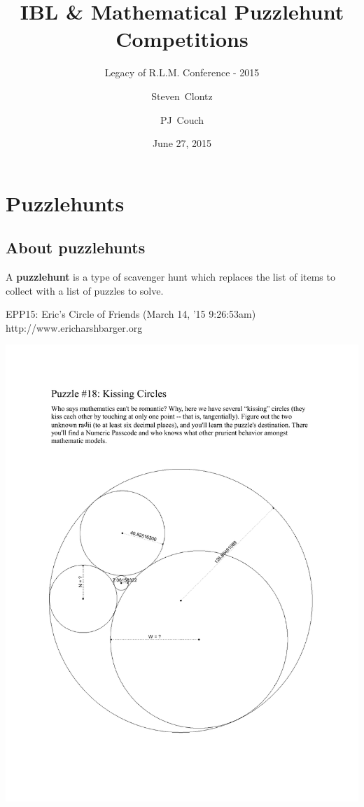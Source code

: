 \documentclass{beamer}
\title
{IBL \& Mathematical Puzzlehunt Competitions}
\subtitle
{Legacy of R.L.M. Conference - 2015} %
\author%
{Steven~Clontz\inst{1} \and PJ~Couch\inst{2}}%
\institute %
{
  \inst{1}
  Auburn, AL
  \and
  \inst{2}
  Lamar University
}
\date[15-06-27] %
{June 27, 2015}
\begin{document}

\begin{frame}
  \titlepage
\end{frame}


\section{Puzzlehunts}

\subsection{About puzzlehunts}

\begin{frame}
  A \textbf{puzzlehunt} is a type of scavenger hunt which replaces
  the list of items to collect
  with a list of puzzles to solve.
\end{frame}

\begin{frame}
  EPP15: Eric's Circle of Friends (March 14, '15 9:26:53am) \\
  http://www.ericharshbarger.org

  \begin{center}
    \includegraphics[height=0.8\paperheight]
    {kissing_circles.pdf}
  \end{center}
\end{frame}
\end{document}
